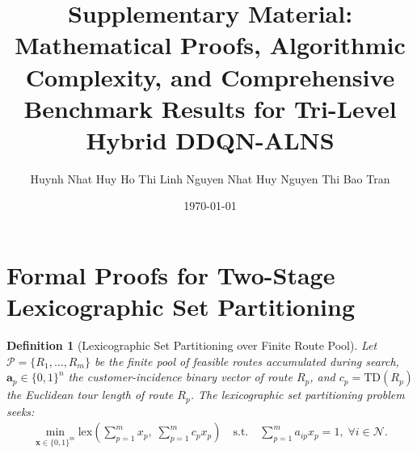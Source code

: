 \documentclass{article}
\title{\textbf{Supplementary Material: Mathematical Proofs, Algorithmic Complexity, and Comprehensive Benchmark Results for Tri-Level Hybrid DDQN-ALNS}}
\author{Huynh Nhat Huy \quad Ho Thi Linh \quad Nguyen Nhat Huy \quad Nguyen Thi Bao Tran}
\date{\today}
\newtheorem{definition}{Definition}
\begin{document}
\maketitle

\section{Formal Proofs for Two-Stage Lexicographic Set Partitioning}

\begin{definition}[Lexicographic Set Partitioning over Finite Route Pool]
Let $\mathcal{P} = \{R_1, \dots, R_m\}$ be the finite pool of feasible routes accumulated during search, $\mathbf{a}_p \in \{0, 1\}^n$ the customer-incidence binary vector of route $R_p$, and $c_p = \text{TD}(R_p)$ the Euclidean tour length of route $R_p$. The lexicographic set partitioning problem seeks:
\begin{align}
\min_{\mathbf{x} \in \{0, 1\}^m} \text{lex} \left( \sum_{p=1}^m x_p, \; \sum_{p=1}^m c_p x_p \right) \quad \text{s.t.} \quad \sum_{p=1}^m a_{ip} x_p = 1, \; \forall i \in \mathcal{N}.
\end{align}
\end{definition}
\end{document}

